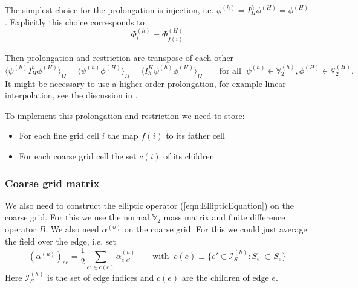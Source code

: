 \documentclass[12pt]{article}
\newcommand{\intOmega}[1]{\langle#1\rangle_{\Omega}}
\newcommand{\Vpressure}{\mathbb{V}_2}
\newcommand{\indexSet}{\mathcal{I}}
\begin{document}
The simplest choice for the prolongation is injection, i.e. $\phi^{(h)} = I_H^h \phi^{(H)} = \phi^{(H)}$. Explicitly this choice corresponds to
\begin{equation}
  \Phi^{(h)}_i = \Phi^{(H)}_{f(i)}
\end{equation}

Then prolongation and restriction are transpose of each other
\begin{equation}
  \intOmega{\psi^{(h)}I_H^h \phi^{(H)}} = \intOmega{\psi^{(h)}\phi^{(H)}} = \intOmega{I_h^H \psi^{(h)}\phi^{(H)}} \qquad\text{for all}\;\; \psi^{(h)}\in \Vpressure^{(h)}, \phi^{(H)} \in\Vpressure^{(H)}.
\end{equation}
It might be necessary to use a higher order prolongation, for example linear interpolation, see the discussion in \cite{Hemker1990}.

To implement this prolongation and restriction we need to store:
\begin{itemize}
  \item For each fine grid cell $i$ the map $f(i)$ to its father cell
  \item For each coarse grid cell the set $c(i)$ of its children
\end{itemize}
\subsubsection{Coarse grid matrix}
We also need to construct the elliptic operator (\ref{eqn:EllipticEquation}) on the coarse grid. For this we use the normal $\Vpressure$ mass matrix and finite difference operator $B$. We also need $\alpha^{(u)}$ on the coarse grid. For this we could just average the field over the edge, i.e. set
\begin{equation}
  \left(\alpha^{(u)}\right)_{ee} = \frac{1}{2} \sum_{e'\in c(e)}\alpha^{(u)}_{e'e'} \qquad\text{with}\;\;c(e) \equiv \{e'\in \indexSet_S^{(h)}:S_{e'}\subset S_{e}\}
\end{equation}
Here $\indexSet_S^{(h)}$ is the set of edge indices and $c(e)$ are the children of edge $e$.
\appendix
\end{document}
